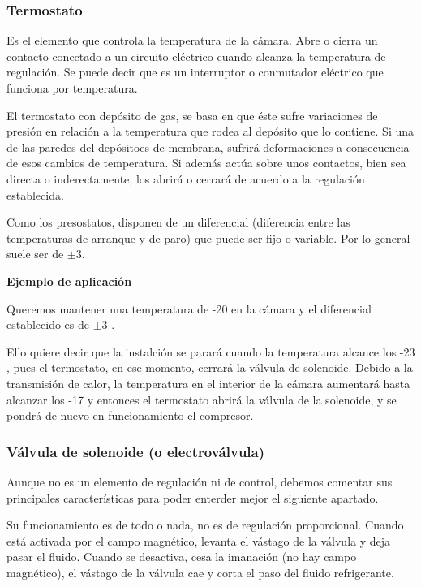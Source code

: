 \subsubsection{Termostato}

Es el elemento que controla la temperatura de la cámara. Abre o cierra un contacto conectado a un circuito eléctrico cuando alcanza la temperatura de regulación. Se puede decir que es un interruptor o conmutador eléctrico que funciona por temperatura.

El termostato con depósito de gas, se basa en que éste sufre variaciones de presión en relación a la temperatura que rodea al depósito que lo contiene. Si una de las paredes del depósitoes de membrana, sufrirá deformaciones a consecuencia de esos cambios de temperatura. Si además actúa sobre unos contactos, bien sea directa o inderectamente, los abrirá o cerrará de acuerdo a la regulación establecida. 

Como los presostatos, disponen de un diferencial (diferencia entre las temperaturas de arranque y de paro) que puede ser fijo o variable. Por lo general suele ser de $\pm 3$.

\textbf{Ejemplo de aplicación}

Queremos mantener una temperatura de -20 \textcelsius en la cámara y el diferencial establecido es de $\pm 3$ \textcelsius.

Ello quiere decir que la instalción se parará cuando la temperatura alcance los -23 \textcelsius, pues el termostato, en ese momento, cerrará la válvula de solenoide. Debido a la transmisión de calor, la temperatura en el interior de la cámara aumentará hasta alcanzar los -17 \textcelsius y entonces el termostato abrirá la válvula de la solenoide, y se pondrá de nuevo en funcionamiento el compresor.

\subsubsection{Válvula de solenoide (o electroválvula)}

Aunque no es un elemento de regulación ni de control, debemos comentar sus principales características para poder enterder mejor el siguiente apartado.

Su funcionamiento es de todo o nada, no es de regulación proporcional. Cuando está activada por el campo magnético, levanta el vástago de la válvula y deja pasar el fluido. Cuando se desactiva, cesa la imanación (no hay campo magnético), el vástago de la válvula cae y corta el paso del fluido refrigerante.

